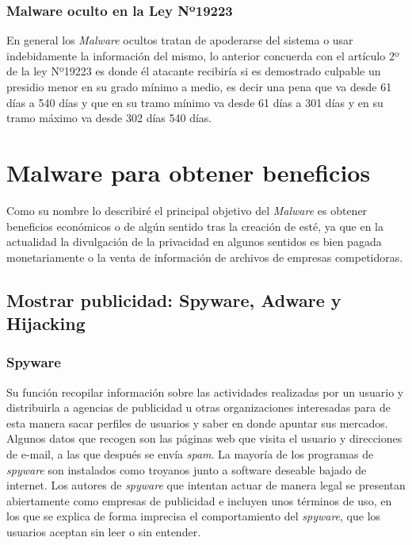 \subsubsection{Malware oculto en la Ley Nº19223}
En general los \textit{Malware} ocultos tratan de apoderarse del sistema o usar indebidamente la información del mismo, lo anterior concuerda con el artículo 2º de la ley Nº19223 es donde él atacante recibiría si es demostrado culpable un presidio menor en su grado mínimo a medio, es decir una pena que va desde 61 días a 540 días y que en su tramo mínimo va desde 61 días a 301 días y en su tramo máximo va desde 302 días 540 días.

\section{Malware para obtener beneficios}
Como su nombre lo describiré el principal objetivo del \textit{Malware} es obtener beneficios económicos o de algún sentido tras la creación de esté, ya que en la actualidad la divulgación de la privacidad en algunos sentidos es bien pagada monetariamente o la venta de información de archivos de empresas competidoras.

\subsection{Mostrar publicidad: Spyware, Adware y Hijacking}
\subsubsection{Spyware} Su función recopilar información sobre las actividades realizadas por un usuario y distribuirla a agencias de publicidad u otras organizaciones interesadas para de esta manera sacar perfiles de usuarios y saber en donde apuntar sus mercados. Algunos datos que recogen son las páginas web que visita el usuario y direcciones de e-mail, a las que después se envía \textit{spam}. La mayoría de los programas de \textit{spyware} son instalados como troyanos junto a software deseable bajado de internet. Los autores de \textit{spyware} que intentan actuar de manera legal se presentan abiertamente como empresas de publicidad e incluyen unos términos de uso, en los que se explica de forma imprecisa el comportamiento del \textit{spyware}, que los usuarios aceptan sin leer o sin entender.


